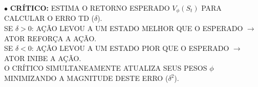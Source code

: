 \documentclass{beamer}
\begin{document}
{\begin{frame}[plain, t]

\vspace{0.25cm}
\hspace{0.3cm}
\begin{minipage}{0.92\textwidth}
{\tiny\ttfamily\setlength{\baselineskip}{1.5\baselineskip}
$\bullet$ \textbf{CRÍTICO:} ESTIMA O RETORNO ESPERADO $V_\phi(S_t)$ PARA CALCULAR O ERRO TD ($\delta$).\\
SE $\delta{>}0$: AÇÃO LEVOU A UM ESTADO MELHOR QUE O ESPERADO $\rightarrow$ ATOR REFORÇA A AÇÃO.\\
SE $\delta{<}0$: AÇÃO LEVOU A UM ESTADO PIOR QUE O ESPERADO $\rightarrow$ ATOR INIBE A AÇÃO.\\
O CRÍTICO SIMULTANEAMENTE ATUALIZA SEUS PESOS $\phi$ MINIMIZANDO A MAGNITUDE DESTE ERRO ($\delta^2$).
}
\end{minipage}

\end{frame}
}



\end{document}
